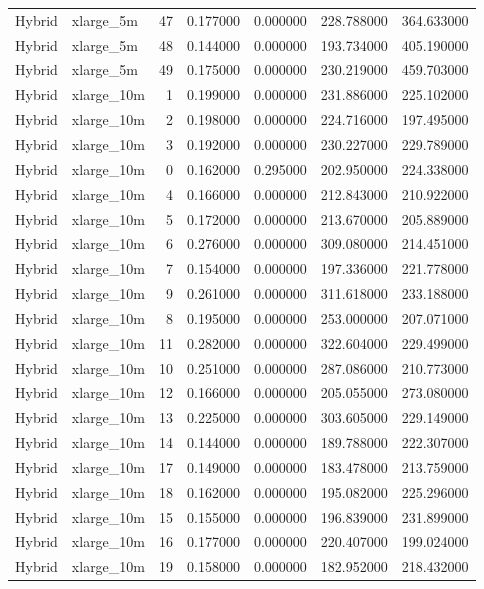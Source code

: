 \begin{tabular}{llrrrrr}
Hybrid & xlarge_5m & 47 & 0.177000 & 0.000000 & 228.788000 & 364.633000 \\
Hybrid & xlarge_5m & 48 & 0.144000 & 0.000000 & 193.734000 & 405.190000 \\
Hybrid & xlarge_5m & 49 & 0.175000 & 0.000000 & 230.219000 & 459.703000 \\
Hybrid & xlarge_10m & 1 & 0.199000 & 0.000000 & 231.886000 & 225.102000 \\
Hybrid & xlarge_10m & 2 & 0.198000 & 0.000000 & 224.716000 & 197.495000 \\
Hybrid & xlarge_10m & 3 & 0.192000 & 0.000000 & 230.227000 & 229.789000 \\
Hybrid & xlarge_10m & 0 & 0.162000 & 0.295000 & 202.950000 & 224.338000 \\
Hybrid & xlarge_10m & 4 & 0.166000 & 0.000000 & 212.843000 & 210.922000 \\
Hybrid & xlarge_10m & 5 & 0.172000 & 0.000000 & 213.670000 & 205.889000 \\
Hybrid & xlarge_10m & 6 & 0.276000 & 0.000000 & 309.080000 & 214.451000 \\
Hybrid & xlarge_10m & 7 & 0.154000 & 0.000000 & 197.336000 & 221.778000 \\
Hybrid & xlarge_10m & 9 & 0.261000 & 0.000000 & 311.618000 & 233.188000 \\
Hybrid & xlarge_10m & 8 & 0.195000 & 0.000000 & 253.000000 & 207.071000 \\
Hybrid & xlarge_10m & 11 & 0.282000 & 0.000000 & 322.604000 & 229.499000 \\
Hybrid & xlarge_10m & 10 & 0.251000 & 0.000000 & 287.086000 & 210.773000 \\
Hybrid & xlarge_10m & 12 & 0.166000 & 0.000000 & 205.055000 & 273.080000 \\
Hybrid & xlarge_10m & 13 & 0.225000 & 0.000000 & 303.605000 & 229.149000 \\
Hybrid & xlarge_10m & 14 & 0.144000 & 0.000000 & 189.788000 & 222.307000 \\
Hybrid & xlarge_10m & 17 & 0.149000 & 0.000000 & 183.478000 & 213.759000 \\
Hybrid & xlarge_10m & 18 & 0.162000 & 0.000000 & 195.082000 & 225.296000 \\
Hybrid & xlarge_10m & 15 & 0.155000 & 0.000000 & 196.839000 & 231.899000 \\
Hybrid & xlarge_10m & 16 & 0.177000 & 0.000000 & 220.407000 & 199.024000 \\
Hybrid & xlarge_10m & 19 & 0.158000 & 0.000000 & 182.952000 & 218.432000 \\

\end{tabular}
